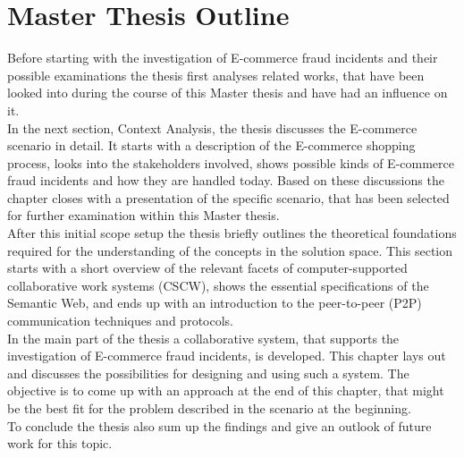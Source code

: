 
\section{Master Thesis Outline}
\label{sec:thesis_outline}

Before starting with the investigation of E-commerce fraud incidents and their possible examinations the thesis first analyses related works, that have been looked into during the course of this Master thesis and have had an influence on it. \\

In the next section, Context Analysis, the thesis discusses the E-commerce scenario in detail. It starts with a description of the E-commerce shopping process, looks into the stakeholders involved, shows possible kinds of E-commerce fraud incidents and how they are handled today. Based on these discussions the chapter closes with a presentation of the specific scenario, that has been selected for further examination within this Master thesis. \\

After this initial scope setup the thesis briefly outlines the theoretical foundations required for the understanding of the concepts in the solution space. This section starts with a short overview of the relevant facets of computer-supported collaborative work systems (\gls{CSCW}), shows the essential  specifications of the Semantic Web, and ends up with an introduction to the peer-to-peer (\gls{P2P}) communication techniques and protocols. \\

In the main part of the thesis a collaborative system, that supports the investigation of E-commerce fraud incidents, is developed. This chapter lays out and discusses the possibilities for designing and using such a system. The objective is to come up with an approach at the end of this chapter, that might be the best fit for the problem described in the scenario at the beginning. \\

To conclude the thesis also sum up the findings and give an outlook of future work for this topic.

